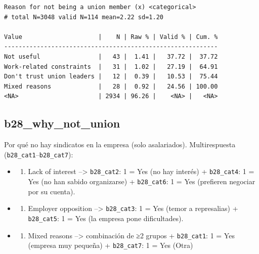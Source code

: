 \documentclass[
  letterpaper,
  DIV=11,
  numbers=noendperiod]{scrreprt}
\providecommand{\tightlist}{%
  \setlength{\itemsep}{0pt}\setlength{\parskip}{0pt}}
\begin{document}
\begin{verbatim}
Reason for not being a union member (x) <categorical> 
# total N=3048 valid N=114 mean=2.22 sd=1.20

Value                     |    N | Raw % | Valid % | Cum. %
-----------------------------------------------------------
Not useful                |   43 |  1.41 |   37.72 |  37.72
Work-related constraints  |   31 |  1.02 |   27.19 |  64.91
Don't trust union leaders |   12 |  0.39 |   10.53 |  75.44
Mixed reasons             |   28 |  0.92 |   24.56 | 100.00
<NA>                      | 2934 | 96.26 |    <NA> |   <NA>
\end{verbatim}

\subsection{b28\_why\_not\_union}\label{b28_why_not_union}

Por qué no hay sindicatos en la empresa (solo asalariados).
Multirespuesta (\texttt{b28\_cat1}--\texttt{b28\_cat7}):

\begin{itemize}
\tightlist
\item
  \begin{enumerate}
  \def\labelenumi{\arabic{enumi}.}
  \tightlist
  \item
    Lack of interest --\textgreater{} \texttt{b28\_cat2}: 1 = Yes (no
    hay interés) + \texttt{b28\_cat4}: 1 = Yes (no han sabido
    organizarse) + \texttt{b28\_cat6}: 1 = Yes (prefieren negociar por
    su cuenta).
  \end{enumerate}
\item
  \begin{enumerate}
  \def\labelenumi{\arabic{enumi}.}
  \setcounter{enumi}{1}
  \tightlist
  \item
    Employer opposition --\textgreater{} \texttt{b28\_cat3}: 1 = Yes
    (temor a represalias) + \texttt{b28\_cat5}: 1 = Yes (la empresa pone
    dificultades).
  \end{enumerate}
\item
  \begin{enumerate}
  \def\labelenumi{\arabic{enumi}.}
  \setcounter{enumi}{2}
  \tightlist
  \item
    Mixed reasons --\textgreater{} combinación de ≥2 grupos +
    \texttt{b28\_cat1}: 1 = Yes (empresa muy pequeña) +
    \texttt{b28\_cat7}: 1 = Yes (Otra)
  \end{enumerate}
\end{itemize}
\end{document}
